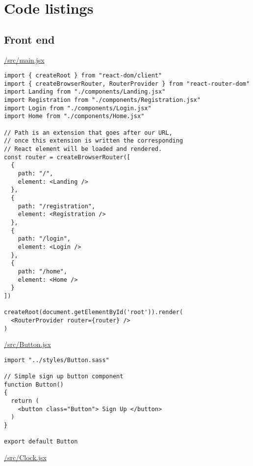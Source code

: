 \appendix

\chapter{Code listings}

\section{Front end}

\underline{/src/main.jsx}

\begin{verbatim}
import { createRoot } from "react-dom/client"
import { createBrowserRouter, RouterProvider } from "react-router-dom"
import Landing from "./components/Landing.jsx"
import Registration from "./components/Registration.jsx"
import Login from "./components/Login.jsx"
import Home from "./components/Home.jsx"

// Path is an extension that goes after our URL,
// once this extension is written the corresponding
// React element will be loaded and rendered.
const router = createBrowserRouter([
  {
    path: "/",
    element: <Landing />
  },
  {
    path: "/registration",
    element: <Registration />
  },
  {
    path: "/login",
    element: <Login />
  },
  {
    path: "/home",
    element: <Home />
  }
])

createRoot(document.getElementById('root')).render(
  <RouterProvider router={router} />
)
\end{verbatim}

\underline{/src/Button.jsx}

\begin{verbatim}
import "../styles/Button.sass"

// Simple sign up button component
function Button()
{
  return (
    <button class="Button"> Sign Up </button>
  )
}

export default Button 
\end{verbatim}

\underline{/src/Clock.jsx}

